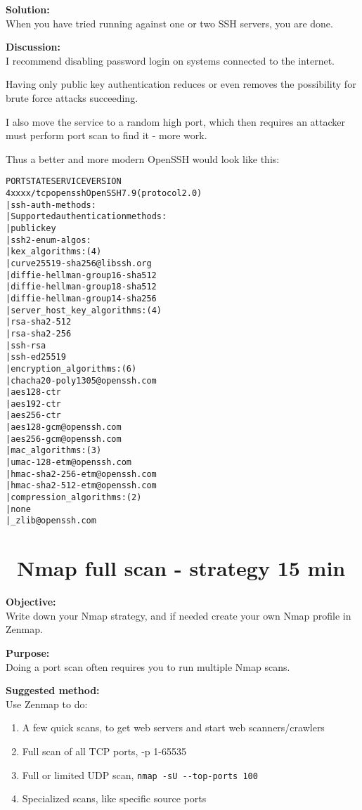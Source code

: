 \documentclass[a4paper,11pt,notitlepage]{report}
\begin{document}
{\bf Solution:}\\
When you have tried running against one or two SSH servers, you are done.

{\bf Discussion:}\\
I recommend disabling password login on systems connected to the internet.

Having only public key authentication reduces or even removes the possibility for brute force attacks succeeding.

I also move the service to a random high port, which then requires an attacker must perform port scan to find it - more work.

Thus a better and more modern OpenSSH would look like this:
\begin{alltt}\footnotesize
PORT      STATE SERVICE VERSION
4xxxx/tcp open  ssh     OpenSSH 7.9 (protocol 2.0)
| ssh-auth-methods:
|   Supported authentication methods:
|     publickey
| ssh2-enum-algos:
|   kex_algorithms: (4)
|       curve25519-sha256@libssh.org
|       diffie-hellman-group16-sha512
|       diffie-hellman-group18-sha512
|       diffie-hellman-group14-sha256
|   server_host_key_algorithms: (4)
|       rsa-sha2-512
|       rsa-sha2-256
|       ssh-rsa
|       ssh-ed25519
|   encryption_algorithms: (6)
|       chacha20-poly1305@openssh.com
|       aes128-ctr
|       aes192-ctr
|       aes256-ctr
|       aes128-gcm@openssh.com
|       aes256-gcm@openssh.com
|   mac_algorithms: (3)
|       umac-128-etm@openssh.com
|       hmac-sha2-256-etm@openssh.com
|       hmac-sha2-512-etm@openssh.com
|   compression_algorithms: (2)
|       none
|_      zlib@openssh.com
\end{alltt}


\chapter{\faExclamationTriangle\ Nmap full scan - strategy 15 min}
\label{ex:nmap-strategy}


{\bf Objective:} \\
Write down your Nmap strategy, and if needed create your own Nmap profile in Zenmap.


{\bf Purpose:}\\
Doing a port scan often requires you to run multiple Nmap scans.


{\bf Suggested method:}\\
Use Zenmap to do:
\begin{enumerate}
\item A few quick scans, to get web servers and start web scanners/crawlers
\item Full scan of all TCP ports, -p 1-65535
\item Full or limited UDP scan, \verb+nmap -sU --top-ports 100+
\item Specialized scans, like specific source ports
\end{enumerate}
\end{document}

